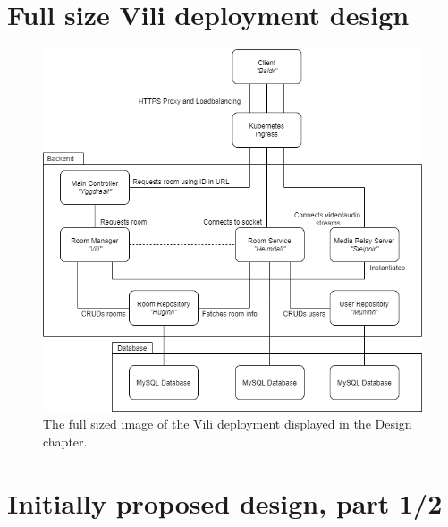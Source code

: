 \newpage
\chapter{Full size Vili deployment design}

\begin{figure}[h]
    \centering
    \includegraphics[width=\textwidth]{Pictures/Vili Final Design.png}
    \caption{The full sized image of the Vili deployment displayed in the Design chapter.}
    \label{fig:viliDesignFullSized}
\end{figure}

\newpage
\chapter{Initially proposed design, part 1/2}

